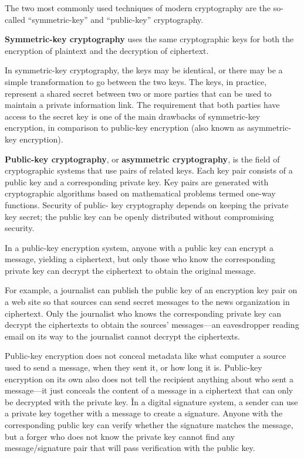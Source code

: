 The two most commonly used techniques of modern cryptography are the so-called ``symmetric-key'' and ``public-key''
cryptography.

\textbf{Symmetric-key cryptography} uses the same cryptographic keys for both the encryption of plaintext and the
decryption of ciphertext. \ed

In symmetric-key cryptography, the keys may be identical, or there may be a simple transformation to go between the
two keys. The keys, in practice, represent a shared secret between two or more parties that can be used to
maintain a private information link. The requirement that both parties have access to the secret key is one of the
main drawbacks of symmetric-key encryption, in comparison to public-key encryption (also known as asymmetric-key
encryption).

\textbf{Public-key cryptography}, or \textbf{asymmetric cryptography}, is the field of cryptographic systems that use
pairs of related keys. Each key pair consists of a public key and a corresponding private key. Key pairs are
generated with cryptographic algorithms based on mathematical problems termed one-way functions. Security of public-
key cryptography depends on keeping the private key secret; the public key can be openly distributed without
compromising security.
\ed

In a public-key encryption system, anyone with a public key can encrypt a message, yielding a ciphertext, but only
those who know the corresponding private key can decrypt the ciphertext to obtain the original message.

\be
For example, a journalist can publish the public key of an encryption key pair on a web site so that sources can send
secret messages to the news organization in ciphertext. Only the journalist who knows the corresponding private key
can decrypt the ciphertexts to obtain the sources' messages—an eavesdropper reading email on its way to the
journalist cannot decrypt the ciphertexts.
\ee

Public-key encryption does not conceal metadata like what computer a source used to send a message, when they sent it,
or how long it is. Public-key encryption on its own also does not tell the recipient anything about who sent a
message—it just conceals the content of a message in a ciphertext that can only be decrypted with the private key. \v

In a digital signature system, a sender can use a private key together with a message to create a signature. Anyone
with the corresponding public key can verify whether the signature matches the message, but a forger who does not
know the private key cannot find any message/signature pair that will pass verification with the public key.

